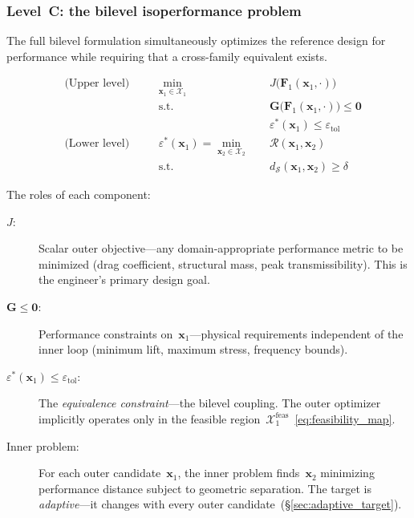 \subsubsection{Level~C: the bilevel isoperformance problem}
\label{sec:bilevel}

The full bilevel formulation simultaneously optimizes the reference design for performance while requiring that a cross-family equivalent exists.

\begin{subequations}
\label{eq:bilevel}
\begin{alignat}{3}
    &\text{(Upper level)} &\quad& \min_{\mathbf{x}_1 \in \mathcal{X}_1}\;
    && J\bigl( \mathbf{F}_1(\mathbf{x}_1, \cdot) \bigr)
    \label{eq:upper_obj} \\
    & &\quad& \text{s.t.}\;
    && \mathbf{G}\bigl( \mathbf{F}_1(\mathbf{x}_1, \cdot) \bigr) \leq \mathbf{0}
    \label{eq:upper_perf_constr} \\
    & & &
    && \varepsilon^*(\mathbf{x}_1) \leq \varepsilon_{\mathrm{tol}}
    \label{eq:upper_coupling} \\[6pt]
    &\text{(Lower level)} &\quad&
    \varepsilon^*(\mathbf{x}_1) = \min_{\mathbf{x}_2 \in \mathcal{X}_2}\;
    && \mathcal{R}(\mathbf{x}_1, \mathbf{x}_2)
    \label{eq:lower_obj} \\
    & &\quad& \text{s.t.}\;
    && d_{\mathcal{S}}(\mathbf{x}_1, \mathbf{x}_2) \geq \delta
    \label{eq:lower_constr}
\end{alignat}
\end{subequations}

The roles of each component:
\begin{description}
    \item[$J$:] Scalar outer objective---any domain-appropriate performance metric to be minimized (drag coefficient, structural mass, peak transmissibility). This is the engineer's primary design goal.
    \item[$\mathbf{G} \leq \mathbf{0}$:] Performance constraints on~$\mathbf{x}_1$---physical requirements independent of the inner loop (minimum lift, maximum stress, frequency bounds).
    \item[$\varepsilon^*(\mathbf{x}_1) \leq \varepsilon_{\mathrm{tol}}$:] The \emph{equivalence constraint}---the bilevel coupling. The outer optimizer implicitly operates only in the feasible region~$\mathcal{X}_1^{\mathrm{feas}}$~\eqref{eq:feasibility_map}.
    \item[Inner problem:] For each outer candidate~$\mathbf{x}_1$, the inner problem finds~$\mathbf{x}_2$ minimizing performance distance subject to geometric separation. The target is \emph{adaptive}---it changes with every outer candidate~(\S\ref{sec:adaptive_target}).
\end{description}

